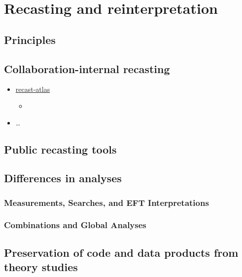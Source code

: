 \documentclass[11pt]{article}
\begin{document}
\section{Recasting and reinterpretation}

\subsection{Principles}

\subsection{Collaboration-internal recasting}

\begin{itemize}
    \item \href{https://github.com/recast-hep/recast-atlas}{recast-atlas}
        \begin{itemize}
            \item {}
        \end{itemize}
    \item \ldots
\end{itemize}

\subsection{Public recasting tools}

\subsection{Differences in analyses}

\subsubsection{Measurements, Searches, and EFT Interpretations}

\subsubsection{Combinations and Global Analyses}

\subsection{Preservation of code and data products from theory studies}
\end{document}
